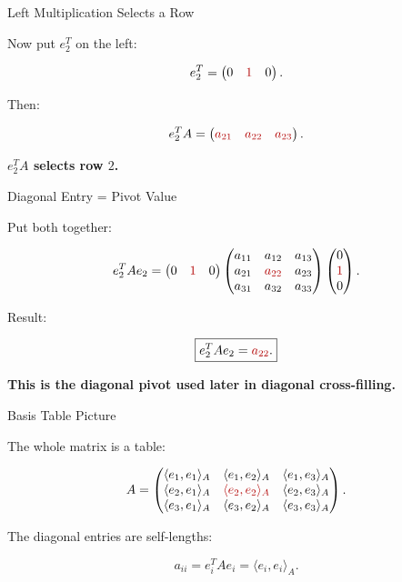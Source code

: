 \documentclass[10pt]{beamer}
\theoremstyle{definition}
\newcommand{\x}[1]{\alert{\textbf{#1}}}
\newcommand{\rd}[1]{{\color{red!70!black}#1}}
\begin{document}
\begin{frame}{Left Multiplication Selects a Row}

Now put $e_2^T$ on the left:

$$
e_2^T=\begin{pmatrix}0&\rd{1}&0\end{pmatrix}.
$$

\vfill

Then:

$$
e_2^TA
=
\begin{pmatrix}
\rd{a_{21}}&\rd{a_{22}}&\rd{a_{23}}
\end{pmatrix}.
$$

\vfill

\begin{center}
\x{$e_2^TA$ selects row $2$.}
\end{center}

\end{frame}


\begin{frame}{Diagonal Entry = Pivot Value}

Put both together:

$$
e_2^TAe_2
=
\begin{pmatrix}0&\rd{1}&0\end{pmatrix}
\begin{pmatrix}
a_{11}&a_{12}&a_{13}\\
a_{21}&\rd{a_{22}}&a_{23}\\
a_{31}&a_{32}&a_{33}
\end{pmatrix}
\begin{pmatrix}0\\\rd{1}\\0\end{pmatrix}.
$$

\vfill

Result:

$$
\boxed{e_2^TAe_2=\rd{a_{22}}.}
$$

\vfill

\begin{center}
\x{This is the diagonal pivot used later in diagonal cross-filling.}
\end{center}

\end{frame}


\begin{frame}{Basis Table Picture}

The whole matrix is a table:

$$
A=
\begin{pmatrix}
\langle e_1,e_1\rangle_A & \langle e_1,e_2\rangle_A & \langle e_1,e_3\rangle_A\\
\langle e_2,e_1\rangle_A & \rd{\langle e_2,e_2\rangle_A} & \langle e_2,e_3\rangle_A\\
\langle e_3,e_1\rangle_A & \langle e_3,e_2\rangle_A & \langle e_3,e_3\rangle_A
\end{pmatrix}.
$$

\vfill

The diagonal entries are self-lengths:

$$
a_{ii}=e_i^TAe_i=\langle e_i,e_i\rangle_A.
$$

\end{frame}
\end{document}
